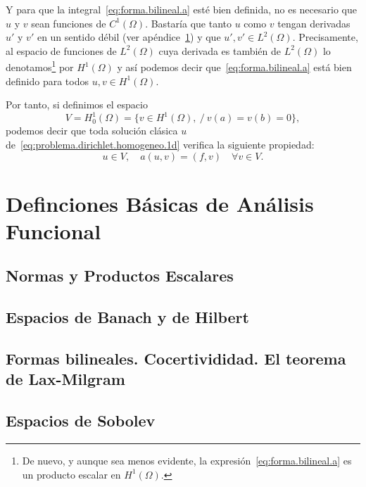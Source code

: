 \documentclass[11pt]{article}
\theoremstyle{plain}
\theoremstyle{definition}
\newcounter{stepnum}[section]
\newcommand{\step}{\bigskip\noindent\textbf{\thesection.\refstepcounter{stepnum}\thestepnum}.\enspace}
\begin{document}
Y para que la integral~\eqref{eq:forma.bilineal.a} esté bien definida, no es necesario que $u$ y $v$ sean funciones de $C^1(\Omega)$. Bastaría que tanto $u$ como $v$ tengan derivadas $u'$ y $v'$ en un sentido débil (ver apéndice~\ref{sec:definiciones.basicas}) y que $u',v'\in L^2(\Omega)$. Precisamente, al espacio de funciones de $L^2(\Omega)$ cuya derivada es también de $L^2(\Omega)$ lo denotamos\footnote{
  De nuevo, y aunque sea menos evidente, la expresión~\eqref{eq:forma.bilineal.a} es un producto escalar en $H^1(\Omega)$.
} por $H^1(\Omega)$ y así podemos decir que~\eqref{eq:forma.bilineal.a} está bien definido para todos $u,v\in H^1(\Omega)$.



%
%   
%
%
Por tanto, si definimos el espacio
\begin{equation*}
  V= H_0^1(\Omega) = \{v\in H^1(\Omega), \ /\ v(a)=v(b)=0\},
\end{equation*}
podemos decir que toda solución clásica $u$ de~\eqref{eq:problema.dirichlet.homogeneo.1d} verifica la siguiente propiedad:
\begin{equation}
u \in V, \quad a(u,v) = (f,v) \quad \forall v\in V.
  \label{eq:formulacon.variacional.1d}
\end{equation}


\appendix

\section{Definciones Básicas de Análisis Funcional}
\label{sec:definiciones.basicas}

\subsection{Normas y Productos Escalares}

\subsection{Espacios de Banach y de Hilbert}

\subsection{Formas bilineales. Cocertivididad. El teorema de Lax-Milgram}

\subsection{Espacios de Sobolev}




\end{document}
